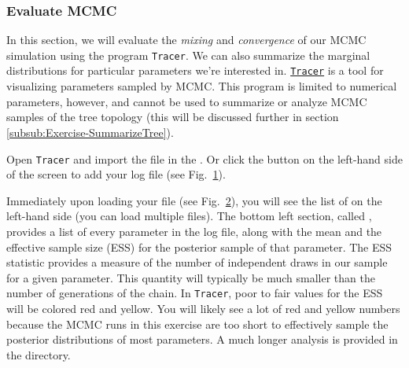
\medskip
\subsubsection{Evaluate MCMC}\label{subsub:Exercise-EvalMCMC}

In this section, we will evaluate the \textit{mixing} and \textit{convergence} of our MCMC simulation using the program {\tt Tracer}.
We can also summarize the marginal distributions for particular parameters we're interested in.
\href{http://tree.bio.ed.ac.uk/software/tracer/}{\tt Tracer} \citep{Rambaut2011} is a tool for visualizing parameters sampled by MCMC.
This program is limited to numerical parameters, however, and cannot be used to summarize or analyze MCMC samples of the tree topology (this will be discussed further in section \ref{subsub:Exercise-SummarizeTree}).

\begin{figure}[h!]
\label{fig:tracer}
\end{figure}


\begin{framed}
Open {\tt Tracer} and import the  file in the .
Or click the \fbox{$+$} button on the left-hand side of the screen to add your log file (see Fig.\ \ref{fig:tracer}).
\end{framed}

\begin{figure}[h!]
\label{fig:tracer-post-ests}
\end{figure}


Immediately upon loading your file (see Fig.\ \ref{fig:tracer-post-ests}), 
you will see the list of  on the left-hand side (you can load multiple files).
The bottom left section, called , provides a list of every parameter in the log file, along with the mean and the effective sample size (ESS) for the posterior sample of that parameter.
The ESS statistic provides a measure of the number of independent draws in our sample for a given parameter.
This quantity will typically be much smaller than the number of generations of the chain.
In {\tt Tracer}, poor to fair values for the ESS will be colored red and yellow.
You will likely see a lot of red and yellow numbers because the MCMC runs in this exercise are too short to effectively sample the posterior distributions of most parameters.
A much longer analysis is provided in the  directory. 

